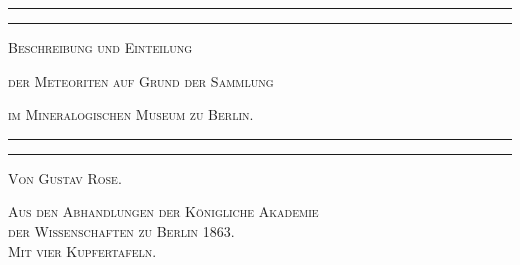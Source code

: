 \documentclass[a4paper, 11pt, oneside]{article}
\begin{document}
\begin{titlepage} %
	\centering %

	
	\rule{\textwidth}{1.6pt}\vspace*{-\baselineskip}\vspace*{2pt} %
	\rule{\textwidth}{0.4pt} %
	
	\vspace{1.5\baselineskip} %
	
	{\scshape\LARGE Beschreibung und Einteilung}
	
	\vspace{1\baselineskip} %

	{\scshape\LARGE der Meteoriten auf Grund der Sammlung}

	\vspace{1\baselineskip} %

	{\scshape\LARGE im Mineralogischen Museum zu Berlin.}

	\vspace{1.5\baselineskip} %

	\rule{\textwidth}{0.4pt}\vspace*{-\baselineskip}\vspace{3.2pt} %
	\rule{\textwidth}{1.6pt} %
	
	\vspace{1\baselineskip} %
	
	
	{\scshape Von Gustav Rose.} %
	
	\vspace*{1\baselineskip} %
	
    {\scshape\small Aus den Abhandlungen der Königliche Akademie\\ der Wissenschaften zu Berlin 1863.\\Mit vier Kupfertafeln.} %
    
    \vspace*{\fill}


\end{titlepage}
\end{document}
